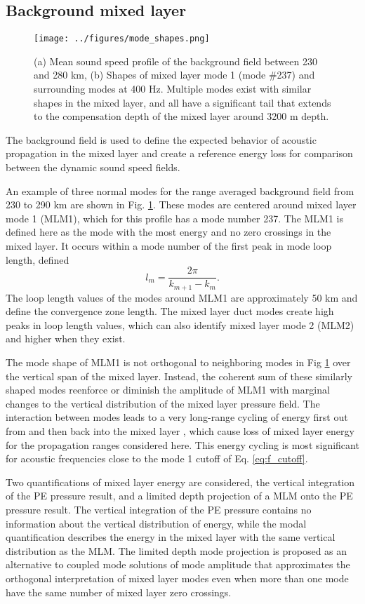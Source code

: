 \documentclass[preprint,NumberedRefs]{JASA}
\begin{document}
\subsection{Background mixed layer}\label{ssec:bg}
\begin{figure}
\texttt{[image: ../figures/mode\_shapes.png]}
    \caption{\label{fig:bg_modes}{(a) Mean sound speed profile of the background field between 230 and 280 km, (b) Shapes of mixed layer mode 1 (mode \#237) and surrounding modes at 400 Hz. Multiple modes exist with similar shapes in the mixed layer, and all have a significant tail that extends to the compensation depth of the mixed layer around 3200 m depth.}}
\end{figure}
The background field is used to define the expected behavior of acoustic propagation in the mixed layer and create a reference energy loss for comparison between the dynamic sound speed fields.

An example of three normal modes for the range averaged background field from 230 to 290 km are shown in Fig. \ref{fig:bg_modes}. These modes are centered around mixed layer mode 1 (MLM1), which for this profile has a mode number 237. The MLM1 is defined here as the mode with the most energy and no zero crossings in the mixed layer. It occurs within a mode number of the first peak in mode loop length\citep{jensen2011computational}, defined
\begin{equation}
    l_{m} = \frac{2 \pi}{k_{m+1} - k_m}.
    \label{eq:loop_length}
\end{equation}
The loop length values of the modes around MLM1 are approximately 50 km and define the convergence zone length. The mixed layer duct modes create high peaks in loop length values, which can also identify mixed layer mode 2 (MLM2) and higher when they exist.

The mode shape of MLM1 is not orthogonal to neighboring modes in Fig \ref{fig:bg_modes} over the vertical span of the mixed layer. Instead, the coherent sum of these similarly shaped modes reenforce or diminish the amplitude of MLM1 with marginal changes to the vertical distribution of the mixed layer pressure field. The interaction between modes leads to a very long-range cycling of energy first out from and then back into the mixed layer \citep{porter93}, which cause loss of mixed layer energy for the propagation ranges considered here. This energy cycling is most significant for acoustic frequencies close to the mode 1 cutoff of Eq. \eqref{eq:f_cutoff}.

Two quantifications of mixed layer energy are considered, the vertical integration of the PE pressure result, and a limited depth projection of a MLM onto the PE pressure result. The vertical integration of the PE pressure contains no information about the vertical distribution of energy, while the modal quantification describes the energy in the mixed layer with the same vertical distribution as the MLM. The limited depth mode projection is proposed as an alternative to coupled mode solutions of mode amplitude that approximates the orthogonal interpretation of mixed layer modes even when more than one mode have the same number of mixed layer zero crossings.
\end{document}
